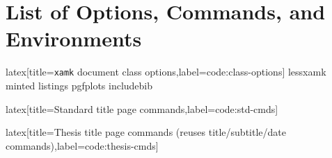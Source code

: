 \section{List of Options, Commands, and Environments}

\begin{code}{latex}[title={\texttt{xamk} document class options},label=code:class-options]
lessxamk
minted
listings
pgfplots
includebib
\end{code}
%
\begin{code}{latex}[title={Standard title page commands},label=code:std-cmds]
\maketitle
\end{code}
%
\begin{code}{latex}[title={Thesis title page commands (reuses title/subtitle/date commands)},label=code:thesis-cmds]
\maketitle[thesis]
\end{code}
